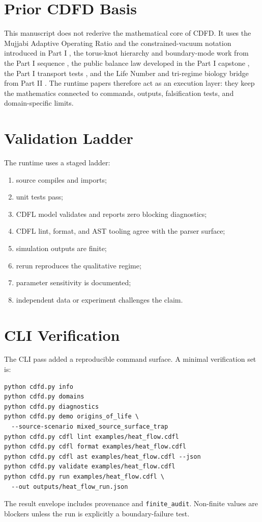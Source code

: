\documentclass[12pt,a4paper]{article}
\begin{document}
\section{Prior CDFD Basis}
This manuscript does not rederive the mathematical core of CDFD. It uses the
Mujjabi Adaptive Operating Ratio and the constrained-vacuum notation introduced
in Part I \cite{MujjabiI2026}, the torus-knot hierarchy and boundary-mode work
from the Part I sequence \cite{MujjabiVI2026,MujjabiIX2026}, the public balance
law developed in the Part I capstone \cite{MujjabiX2026}, the Part I transport
tests \cite{MujjabiXII2026}, and the Life Number and tri-regime biology bridge
from Part II \cite{MujjabiPartII2026}. The runtime papers therefore act as an
execution layer: they keep the mathematics connected to commands, outputs,
falsification tests, and domain-specific limits.


\section{Validation Ladder}
The runtime uses a staged ladder:
\begin{enumerate}
    \item source compiles and imports;
    \item unit tests pass;
    \item CDFL model validates and reports zero blocking diagnostics;
    \item CDFL lint, format, and AST tooling agree with the parser surface;
    \item simulation outputs are finite;
    \item rerun reproduces the qualitative regime;
    \item parameter sensitivity is documented;
    \item independent data or experiment challenges the claim.
\end{enumerate}

\section{CLI Verification}
The CLI pass added a reproducible command surface. A minimal verification set
is:
\begin{verbatim}
python cdfd.py info
python cdfd.py domains
python cdfd.py diagnostics
python cdfd.py demo origins_of_life \
  --source-scenario mixed_source_surface_trap
python cdfd.py cdfl lint examples/heat_flow.cdfl
python cdfd.py cdfl format examples/heat_flow.cdfl
python cdfd.py cdfl ast examples/heat_flow.cdfl --json
python cdfd.py validate examples/heat_flow.cdfl
python cdfd.py run examples/heat_flow.cdfl \
  --out outputs/heat_flow_run.json
\end{verbatim}
The result envelope includes provenance and \texttt{finite\_audit}. Non-finite
values are blockers unless the run is explicitly a boundary-failure test.
\end{document}

